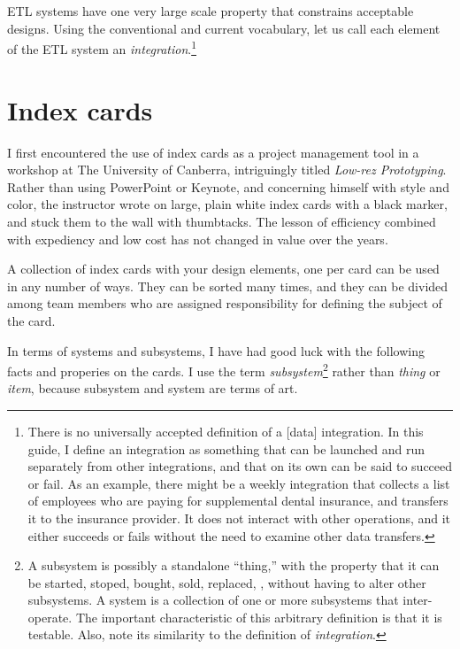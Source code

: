 \documentclass[11pt,letterpaper,twosided]{memoir}
\begin{document}
ETL systems have one very large scale property that constrains
acceptable designs. Using the conventional and current vocabulary,
let us call each element of the ETL system an \emph{integration}.\footnote{
There is no universally accepted definition of a [data] integration.
In this guide, I define an integration as something that can be
launched and run separately from other integrations, and that 
on its own can be said to succeed or fail. As an example, there
might be a weekly integration that collects a list of employees
who are paying for supplemental dental insurance, and transfers
it to the insurance provider. It does not interact with other
operations, and it either succeeds or fails without the need
to examine other data transfers.}

\section{Index cards}

I first encountered the use of index cards as a project management
tool in a workshop at The University of Canberra, intriguingly
titled \emph{Low-rez Prototyping}.  Rather than using PowerPoint
or Keynote, and concerning himself with style and color, the
instructor wrote on large, plain white index cards with a black
marker, and stuck them to the wall with thumbtacks. The lesson of
efficiency combined with expediency and low cost has not changed
in value over the years.

A collection of index cards with your design elements, one per card
can be used in any number of ways. They can be sorted many times,
and they can be divided among team members who are assigned
responsibility for defining the subject of the card.

In terms of systems and subsystems, I have had good luck with the
following facts and properies on the cards. I use the term
\emph{subsystem}\footnote{A subsystem is possibly a standalone
``thing,'' with the property that it can be started, stoped, bought,
sold, replaced, \etc, without having to alter other subsystems. A
system is a collection of one or more subsystems that inter-operate.
The important characteristic of this arbitrary definition is that
it is testable. Also, note its similarity to the definition of 
\emph{integration}.} rather than \emph{thing} or \emph{item}, because
subsystem and system are terms of art.
\end{document}
